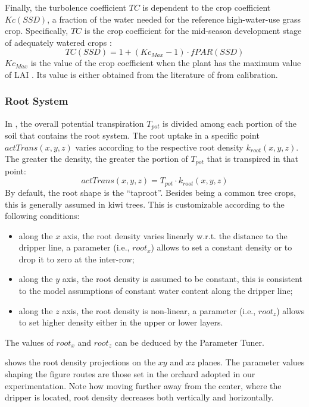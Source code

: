 Finally, the turbolence coefficient $TC$ is dependent to the crop coefficient $Kc(SSD)$, a fraction of the water needed for the reference high-water-use grass crop.
Specifically, $TC$ is the crop coefficient for the mid-season development stage of adequately watered crops \cite{driessen1992land}:
\begin{equation}
\label{TC} TC(SSD) = 1 + (Kc_{Max}-1) \cdot fPAR(SSD)
\end{equation}
$Kc_{Max}$ is the value of the crop coefficient when the plant has the maximum value of LAI \cite{allen-etal-1988}.
Its value is either obtained from the literature of from calibration.



\subsubsection{Root System}
\label{orchard-sec:root}
In \olab{}, the overall potential transpiration $T_{pot}$ is divided among each portion of the soil that contains the root system.
The root uptake in a specific point $actTrans(x,y,z)$ varies according to the respective root density $k_{root}(x,y,z)$.
The greater the density, the greater the portion of $T_{pot}$ that is transpired in that point:
%
\begin{equation}
\label{root1} actTrans(x,y,z) = T_{pot} \cdot k_{root}(x,y,z)
\end{equation}
%
By default, the root shape is the ``taproot''.
Besides being a common tree crops, this is generally assumed in kiwi trees. 
This is customizable according to the following conditions:
\begin{itemize}
    \item along the $x$ axis, the root density varies linearly w.r.t. the distance to the dripper line, a parameter (i.e., $root_x$) allows to set a constant density or to drop it to zero at the inter-row;
    \item along the $y$ axis, the root density is assumed to be constant, this is consistent to the model assumptions of constant water content along the dripper line; 
    \item along the $z$ axis, the root density is non-linear, a parameter (i.e., $root_z$) allows to set higher density either in the upper or lower layers.
\end{itemize}

The values of $root_x$ and $root_z$ can be deduced by the Parameter Tuner.

 shows the root density projections on the $xy$ and $xz$  planes.
The parameter values shaping the figure routes are those set in the orchard adopted in our experimentation.
Note how moving further away from the center, where the dripper is located, root density decreases both vertically and horizontally. 

